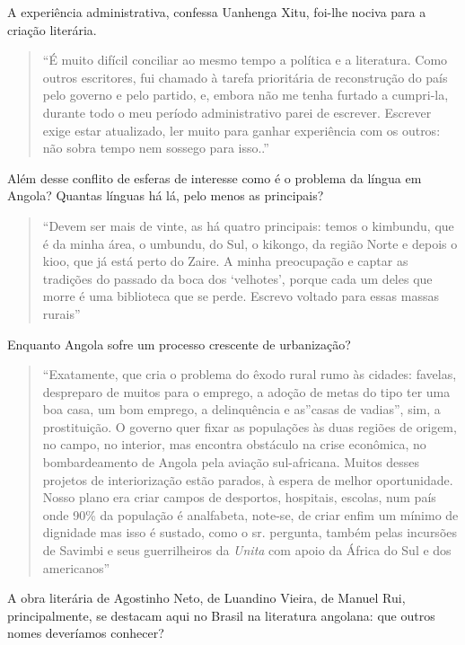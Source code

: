 \documentclass[
  letterpaper,
  DIV=11,
  numbers=noendperiod]{scrreprt}
\begin{document}
A experiência administrativa, confessa Uanhenga Xitu, foi-lhe nociva
para a criação literária.

\begin{quote}
``É muito difícil conciliar ao mesmo tempo a política e a literatura.
Como outros escritores, fui chamado à tarefa prioritária de reconstrução
do país pelo governo e pelo partido, e, embora não me tenha furtado a
cumpri-la, durante todo o meu período administrativo parei de escrever.
Escrever exige estar atualizado, ler muito para ganhar experiência com
os outros: não sobra tempo nem sossego para isso..''
\end{quote}

Além desse conflito de esferas de interesse como é o problema da língua
em Angola? Quantas línguas há lá, pelo menos as principais?

\begin{quote}
``Devem ser mais de vinte, as há quatro principais: temos o kimbundu,
que é da minha área, o umbundu, do Sul, o kikongo, da região Norte e
depois o kioo, que já está perto do Zaire. A minha preocupação e captar
as tradições do passado da boca dos `velhotes', porque cada um deles que
morre é uma biblioteca que se perde. Escrevo voltado para essas massas
rurais''
\end{quote}

Enquanto Angola sofre um processo crescente de urbanização?

\begin{quote}
``Exatamente, que cria o problema do êxodo rural rumo às cidades:
favelas, despreparo de muitos para o emprego, a adoção de metas do tipo
ter uma boa casa, um bom emprego, a delinquência e as''casas de
vadias'', sim, a prostituição. O governo quer fixar as populações às
duas regiões de origem, no campo, no interior, mas encontra obstáculo na
crise econômica, no bombardeamento de Angola pela aviação sul-africana.
Muitos desses projetos de interiorização estão parados, à espera de
melhor oportunidade. Nosso plano era criar campos de desportos,
hospitais, escolas, num país onde 90\% da população é analfabeta,
note-se, de criar enfim um mínimo de dignidade mas isso é sustado, como
o sr. pergunta, também pelas incursões de Savimbi e seus guerrilheiros
da \emph{Unita} com apoio da África do Sul e dos americanos''
\end{quote}

A obra literária de Agostinho Neto, de Luandino Vieira, de Manuel Rui,
principalmente, se destacam aqui no Brasil na literatura angolana: que
outros nomes deveríamos conhecer?
\end{document}
